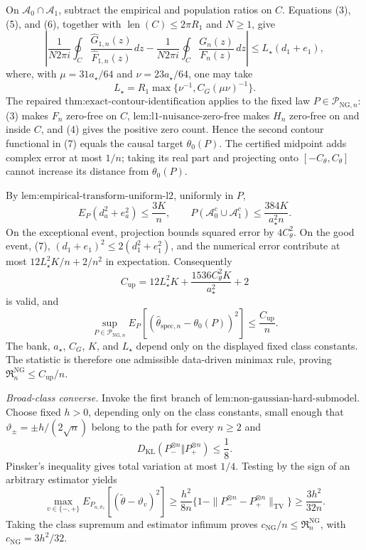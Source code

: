 On \(\mathcal A_0\cap\mathcal A_1\), subtract the empirical and population ratios on \(C\).  Equations (3), (5), and (6), together with \(\operatorname{len}(C)\le2\pi R_1\) and \(N\ge1\), give
\[
 \left|
 \frac{1}{N2\pi i}\oint_C
 \frac{\widehat G_{1,n}(z)}{\widehat F_{1,n}(z)}\,dz
 -
 \frac{1}{N2\pi i}\oint_C
 \frac{G_n(z)}{F_n(z)}\,dz
 \right|
 \le L_{\star}(d_1+e_1),
 \tag{7}
\]
where, with \(\mu=31a_{\star}/64\) and \(\nu=23a_{\star}/64\), one may take
\[
 L_{\star}=R_1\max\{\nu^{-1},C_G(\mu\nu)^{-1}\}.
\]
The repaired \(\text{thm:exact-contour-identification}\) applies to the fixed law \(P\in\mathcal P_{\mathrm{NG},n}\): (3) makes \(F_n\) zero-free on \(C\), \(\text{lem:l1-nuisance-zero-free}\) makes \(H_n\) zero-free on and inside \(C\), and (4) gives the positive zero count.  Hence the second contour functional in (7) equals the causal target \(\theta_0(P)\).  The certified midpoint adds complex error at most \(1/n\); taking its real part and projecting onto \([-C_{\theta},C_{\theta}]\) cannot increase its distance from \(\theta_0(P)\).

By \(\text{lem:empirical-transform-uniform-l2}\), uniformly in \(P\),
\[
 E_P(d_a^2+e_a^2)\le\frac{3K}{n},
 \qquad
 P(\mathcal A_0^c\cup\mathcal A_1^c)
 \le\frac{384K}{a_{\star}^2n}.
 \tag{8}
\]
On the exceptional event, projection bounds squared error by \(4C_{\theta}^2\).  On the good event, (7), \((d_1+e_1)^2\le2(d_1^2+e_1^2)\), and the numerical error contribute at most \(12L_{\star}^2K/n+2/n^2\) in expectation.  Consequently
\[
 C_{\mathrm{up}}
 =12L_{\star}^2K
 +\frac{1536C_{\theta}^2K}{a_{\star}^2}+2
\]
is valid, and
\[
 \sup_{P\in\mathcal P_{\mathrm{NG},n}}
 E_P[(\widehat\theta_{\mathrm{spec},n}-\theta_0(P))^2]
 \le\frac{C_{\mathrm{up}}}{n}.
 \tag{9}
\]
The bank, \(a_{\star}\), \(C_G\), \(K\), and \(L_{\star}\) depend only on the displayed fixed class constants.  The statistic is therefore one admissible data-driven minimax rule, proving \(\mathfrak R_n^{\mathrm{NG}}\le C_{\mathrm{up}}/n\).

\emph{Broad-class converse.}  Invoke the first branch of \(\text{lem:non-gaussian-hard-submodel}\).  Choose fixed \(h>0\), depending only on the class constants, small enough that \(\vartheta_{\pm}=\pm h/(2\sqrt n)\) belong to the path for every \(n\ge2\) and
\[
 D_{\mathrm{KL}}(P_-^{\otimes n}\Vert P_+^{\otimes n})\le\frac18.
\]
Pinsker's inequality gives total variation at most \(1/4\).  Testing by the sign of an arbitrary estimator yields
\[
 \max_{v\in\{-,+\}}
 E_{P_{n,\vartheta_v}}[(\widetilde\theta-\vartheta_v)^2]
 \ge\frac{h^2}{8n}
 \{1-\|P_-^{\otimes n}-P_+^{\otimes n}\|_{\mathrm{TV}}\}
 \ge\frac{3h^2}{32n}.
\]
Taking the class supremum and estimator infimum proves \(c_{\mathrm{NG}}/n\le\mathfrak R_n^{\mathrm{NG}}\), with \(c_{\mathrm{NG}}=3h^2/32\).


